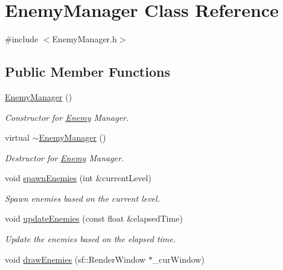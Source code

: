 \hypertarget{class_enemy_manager}{}\section{Enemy\+Manager Class Reference}
\label{class_enemy_manager}


{\ttfamily \#include $<$Enemy\+Manager.\+h$>$}

\subsection*{Public Member Functions}
\begin{DoxyCompactItemize}
\item 
\mbox{\label{class_enemy_manager_ae8d3abb80956df199094432e49ca0d13}} 
\hyperlink{class_enemy_manager_ae8d3abb80956df199094432e49ca0d13}{Enemy\+Manager} ()
\begin{DoxyCompactList}\small\item\em Constructor for \hyperlink{class_enemy}{Enemy} Manager. \end{DoxyCompactList}\item 
\mbox{\label{class_enemy_manager_afe3583e45273d5509e59467d06a3feb6}} 
virtual \hyperlink{class_enemy_manager_afe3583e45273d5509e59467d06a3feb6}{$\sim$\+Enemy\+Manager} ()
\begin{DoxyCompactList}\small\item\em Destructor for \hyperlink{class_enemy}{Enemy} Manager. \end{DoxyCompactList}\item 
void \hyperlink{class_enemy_manager_a37036db8aad73493103815dc45c6339d}{spawn\+Enemies} (int \&current\+Level)
\begin{DoxyCompactList}\small\item\em Spawn enemies based on the current level. \end{DoxyCompactList}\item 
void \hyperlink{class_enemy_manager_a8a3caf890d121478e41dcc192a8aa4a2}{update\+Enemies} (const float \&elapsed\+Time)
\begin{DoxyCompactList}\small\item\em Update the enemies based on the elapsed time. \end{DoxyCompactList}\item 
void \hyperlink{class_enemy_manager_af740dd63780a06fde9a5dd72330624da}{draw\+Enemies} (sf\+::\+Render\+Window $\ast$\+\_\+cur\+Window)

\end{DoxyCompactItemize}
